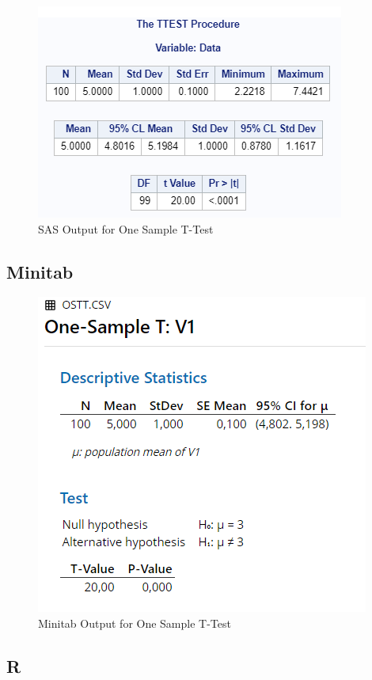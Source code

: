 \documentclass[
]{book}
\begin{document}
\begin{figure}[!h]
\includegraphics{Screenshots/One Sample T test/osttSAS} \caption{\label{fig:osttSAS}SAS Output for One Sample T-Test}\label{fig:osttSAS}
\end{figure}

\hypertarget{minitab-4}{%
\subsection{Minitab}\label{minitab-4}}

\begin{figure}[!h]
\includegraphics{Screenshots/One Sample T test/osttMinitab} \caption{\label{fig:osttMinitab}Minitab Output for One Sample T-Test}\label{fig:osttMinitab}
\end{figure}

\hypertarget{r-4}{%
\subsection{R}\label{r-4}}
\end{document}
